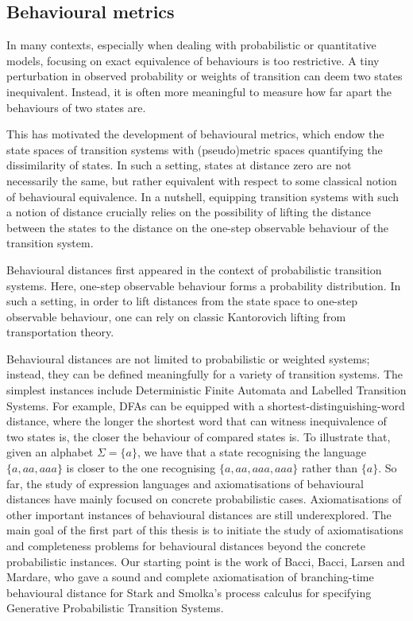 \subsection{Behavioural metrics}
In many contexts, especially when dealing with probabilistic or quantitative models, focusing on exact equivalence of behaviours is too restrictive. A tiny perturbation in observed probability or weights of transition can deem two states inequivalent.  Instead, it is often more meaningful to measure how far apart the behaviours of two states are. 

This has motivated the development of behavioural metrics, which endow the state spaces of transition systems with (pseudo)metric spaces quantifying the dissimilarity of states. In such a setting, states at distance zero are not necessarily the same, but rather equivalent with respect to some classical notion of behavioural equivalence. In a nutshell, equipping transition systems with such a notion of distance crucially relies on the possibility of lifting the distance between the states to the distance on the one-step observable behaviour of the transition system.

Behavioural distances first appeared in the context of probabilistic transition systems. Here, one-step observable behaviour forms a probability distribution. In such a setting, in order to lift distances from the state space to one-step observable behaviour, one can rely on classic Kantorovich lifting from transportation theory. 

Behavioural distances are not limited to probabilistic or weighted systems; instead, they can be defined meaningfully for a variety of transition systems. The simplest instances include Deterministic Finite Automata and Labelled Transition Systems. For example, DFAs can be equipped with a shortest-distinguishing-word distance, where the longer the shortest word that can witness inequivalence of two states is, the closer the behaviour of compared states is. To illustrate that, given an alphabet $\Sigma = \{a\}$, we have that a state recognising the language $\{a,aa, aaa\}$ is closer to the one recognising $\{a,aa,aaa,aaa\}$ rather than $\{a\}$. So far, the study of expression languages and axiomatisations of behavioural distances have mainly focused on concrete probabilistic cases. Axiomatisations of other important instances of behavioural distances are still underexplored. The main goal of the first part of this thesis is to initiate the study of axiomatisations and completeness problems for behavioural distances beyond the concrete probabilistic instances. Our starting point is the work of Bacci, Bacci, Larsen and Mardare, who gave a sound and complete axiomatisation of branching-time behavioural distance for Stark and Smolka's process calculus for specifying Generative Probabilistic Transition Systems. 





